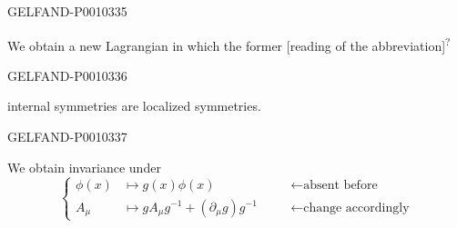 \begin{GelfandAdjacentEvidence}{GELFAND-P001033}{5}


We obtain a new Lagrangian in which the former [reading of the abbreviation]\textsuperscript{?}
\end{GelfandAdjacentEvidence}
\begin{GelfandAdjacentEvidence}{GELFAND-P001033}{6}

internal symmetries are localized symmetries.
\end{GelfandAdjacentEvidence}
\begin{GelfandAdjacentEvidence}{GELFAND-P001033}{7}


We obtain invariance under
\begin{equation*}
\left\{\begin{aligned}
\phi(x)&\mapsto g(x)\phi(x)
&\quad&\longleftarrow \text{absent before}\\
A_\mu&\mapsto gA_\mu g^{-1}+(\partial_\mu g)g^{-1}
&&\longleftarrow \text{change accordingly}
\end{aligned}\right.
\tag{5}
\end{equation*}
\end{GelfandAdjacentEvidence}



